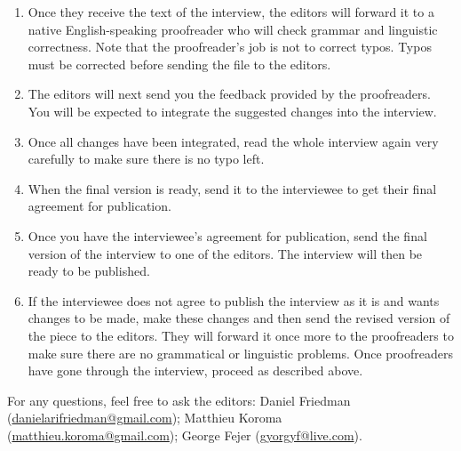 \documentclass[11pt]{article}
\begin{document}
\begin{enumerate}
\begin{itemize}[label=\textendash,leftmargin=1.5em]
  \end{itemize}
\item Once they receive the text of the interview, the editors will forward it to a native English-speaking proofreader who will check grammar and linguistic correctness. Note that the proofreader's job is not to correct typos. Typos must be corrected before sending the file to the editors.
\item The editors will next send you the feedback provided by the proofreaders. You will be expected to integrate the suggested changes into the interview.
\item Once all changes have been integrated, read the whole interview again very carefully to make sure there is no typo left.
\item When the final version is ready, send it to the interviewee to get their final agreement for publication.
\item Once you have the interviewee's agreement for publication, send the final version of the interview to one of the editors. The interview will then be ready to be published.
\item If the interviewee does not agree to publish the interview as it is and wants changes to be made, make these changes and then send the revised version of the piece to the editors. They will forward it once more to the proofreaders to make sure there are no grammatical or linguistic problems. Once proofreaders have gone through the interview, proceed as described above.
\end{enumerate}


For any questions, feel free to ask the editors: Daniel Friedman (\href{mailto:danielarifriedman@gmail.com}{danielarifriedman@gmail.com}); Matthieu Koroma (\href{mailto:matthieu.koroma@gmail.com}{matthieu.koroma@gmail.com}); George Fejer (\href{mailto:gyorgyf@live.com}{gyorgyf@live.com}).
\end{document}
